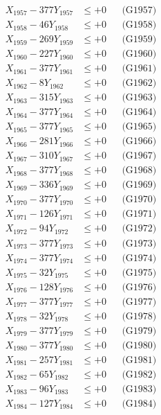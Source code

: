 \documentclass[a4paper,10pt]{article}
\begin{document}
{\begin{align}
X_{1957} - 377Y_{1957} &\leq +0 && \text{(G1957)} \\
X_{1958} - 46Y_{1958} &\leq +0 && \text{(G1958)} \\
X_{1959} - 269Y_{1959} &\leq +0 && \text{(G1959)} \\
X_{1960} - 227Y_{1960} &\leq +0 && \text{(G1960)} \\
\allowbreak
X_{1961} - 377Y_{1961} &\leq +0 && \text{(G1961)} \\
X_{1962} - 8Y_{1962} &\leq +0 && \text{(G1962)} \\
X_{1963} - 315Y_{1963} &\leq +0 && \text{(G1963)} \\
X_{1964} - 377Y_{1964} &\leq +0 && \text{(G1964)} \\
X_{1965} - 377Y_{1965} &\leq +0 && \text{(G1965)} \\
X_{1966} - 281Y_{1966} &\leq +0 && \text{(G1966)} \\
X_{1967} - 310Y_{1967} &\leq +0 && \text{(G1967)} \\
X_{1968} - 377Y_{1968} &\leq +0 && \text{(G1968)} \\
X_{1969} - 336Y_{1969} &\leq +0 && \text{(G1969)} \\
X_{1970} - 377Y_{1970} &\leq +0 && \text{(G1970)} \\
\allowbreak
X_{1971} - 126Y_{1971} &\leq +0 && \text{(G1971)} \\
X_{1972} - 94Y_{1972} &\leq +0 && \text{(G1972)} \\
X_{1973} - 377Y_{1973} &\leq +0 && \text{(G1973)} \\
X_{1974} - 377Y_{1974} &\leq +0 && \text{(G1974)} \\
X_{1975} - 32Y_{1975} &\leq +0 && \text{(G1975)} \\
X_{1976} - 128Y_{1976} &\leq +0 && \text{(G1976)} \\
X_{1977} - 377Y_{1977} &\leq +0 && \text{(G1977)} \\
X_{1978} - 32Y_{1978} &\leq +0 && \text{(G1978)} \\
X_{1979} - 377Y_{1979} &\leq +0 && \text{(G1979)} \\
X_{1980} - 377Y_{1980} &\leq +0 && \text{(G1980)} \\
\allowbreak
X_{1981} - 257Y_{1981} &\leq +0 && \text{(G1981)} \\
X_{1982} - 65Y_{1982} &\leq +0 && \text{(G1982)} \\
X_{1983} - 96Y_{1983} &\leq +0 && \text{(G1983)} \\
X_{1984} - 127Y_{1984} &\leq +0 && \text{(G1984)} \\

\end{align}}
\end{document}

